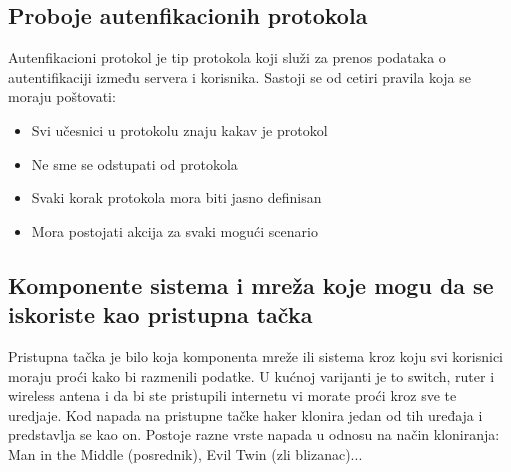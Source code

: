 \documentclass[a4paper]{article}
\begin{document}
{\subsection{Proboje autenfikacionih protokola}
Autenfikacioni protokol je tip protokola koji služi za prenos podataka o autentifikaciji između servera i korisnika. Sastoji se od cetiri pravila koja se moraju poštovati: 
\begin{itemize}
\item Svi učesnici u protokolu znaju kakav je protokol
\item Ne sme se odstupati od protokola
\item Svaki korak protokola mora biti jasno definisan
\item Mora postojati akcija za svaki mogući scenario
\end{itemize}
\cite{authprotocolscrypto} \cite{authprotocolswiki}

\subsection{Komponente sistema i mreža koje mogu da se iskoriste kao pristupna tačka}
Pristupna tačka je bilo koja komponenta mreže ili sistema kroz koju svi korisnici moraju proći kako bi razmenili podatke. U kućnoj varijanti je to switch, ruter i wireless antena i da bi ste pristupili internetu vi morate proći kroz sve te uredjaje. Kod napada na pristupne tačke haker klonira jedan od tih uređaja i predstavlja se kao on. Postoje razne vrste napada u odnosu na način kloniranja: Man in the Middle (posrednik), Evil Twin (zli blizanac)...
\newpage

}
\end{document}
